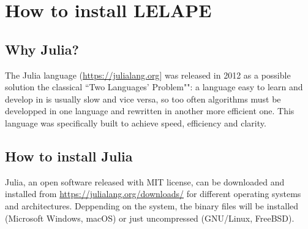 \chapter{How to install LELAPE}
\section{Why Julia?}
The Julia language (\href{https://julialang.org}{https://julialang.org}] was released in 2012 as a possible solution the classical ``Two Languages' Problem"": a language easy to learn and develop in is usually slow and vice versa, so too often algorithms must be developped in one language and rewritten in another more efficient one. This language was specifically built to achieve speed, efficiency and clarity.

\section{How to install Julia}
%
Julia, an open software released with MIT license, can be downloaded and installed from \href{https://julialang.org/downloads/}{https://julialang.org/downloads/} for different operating systems and architectures. Deppending on the system, the binary files will be installed (Microsoft Windows, macOS) or just uncompressed (GNU/Linux, FreeBSD). 

